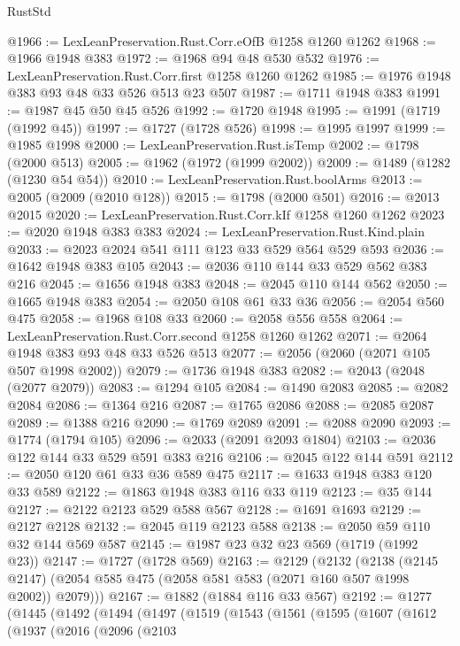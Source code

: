 \begin{lexlean}{RustStd}
\begin{coremodule}
@1966 := LexLeanPreservation.Rust.Corr.eOfB @1258 @1260 @1262
@1968 := @1966 @1948 @383
@1972 := @1968 @94 @48 @530 @532
@1976 := LexLeanPreservation.Rust.Corr.first @1258 @1260 @1262
@1985 := @1976 @1948 @383 @93 @48 @33 @526 @513 @23 @507
@1987 := @1711 @1948 @383
@1991 := @1987 @45 @50 @45 @526
@1992 := @1720 @1948
@1995 := @1991 (@1719 (@1992 @45))
@1997 := @1727 (@1728 @526)
@1998 := @1995 @1997
@1999 := @1985 @1998
@2000 := LexLeanPreservation.Rust.isTemp
@2002 := @1798 (@2000 @513)
@2005 := @1962 (@1972 (@1999 @2002))
@2009 := @1489 (@1282 (@1230 @54 @54))
@2010 := LexLeanPreservation.Rust.boolArms
@2013 := @2005 (@2009 (@2010 @128))
@2015 := @1798 (@2000 @501)
@2016 := @2013 @2015
@2020 := LexLeanPreservation.Rust.Corr.kIf @1258 @1260 @1262
@2023 := @2020 @1948 @383 @383
@2024 := LexLeanPreservation.Rust.Kind.plain
@2033 := @2023 @2024 @541 @111 @123 @33 @529 @564 @529 @593
@2036 := @1642 @1948 @383 @105
@2043 := @2036 @110 @144 @33 @529 @562 @383 @216
@2045 := @1656 @1948 @383
@2048 := @2045 @110 @144 @562
@2050 := @1665 @1948 @383
@2054 := @2050 @108 @61 @33 @36
@2056 := @2054 @560 @475
@2058 := @1968 @108 @33
@2060 := @2058 @556 @558
@2064 := LexLeanPreservation.Rust.Corr.second @1258 @1260 @1262
@2071 := @2064 @1948 @383 @93 @48 @33 @526 @513
@2077 := @2056 (@2060 (@2071 @105 @507 @1998 @2002))
@2079 := @1736 @1948 @383
@2082 := @2043 (@2048 (@2077 @2079))
@2083 := @1294 @105
@2084 := @1490 @2083
@2085 := @2082 @2084
@2086 := @1364 @216
@2087 := @1765 @2086
@2088 := @2085 @2087
@2089 := @1388 @216
@2090 := @1769 @2089
@2091 := @2088 @2090
@2093 := @1774 (@1794 @105)
@2096 := @2033 (@2091 @2093 @1804)
@2103 := @2036 @122 @144 @33 @529 @591 @383 @216
@2106 := @2045 @122 @144 @591
@2112 := @2050 @120 @61 @33 @36 @589 @475
@2117 := @1633 @1948 @383 @120 @33 @589
@2122 := @1863 @1948 @383 @116 @33 @119
@2123 := @35 @144
@2127 := @2122 @2123 @529 @588 @567
@2128 := @1691 @1693
@2129 := @2127 @2128
@2132 := @2045 @119 @2123 @588
@2138 := @2050 @59 @110 @32 @144 @569 @587
@2145 := @1987 @23 @32 @23 @569 (@1719 (@1992 @23))
@2147 := @1727 (@1728 @569)
@2163 := @2129
    (@2132
      (@2138 (@2145 @2147) (@2054 @585 @475 (@2058 @581 @583 (@2071 @160 @507 @1998 @2002)) @2079)))
@2167 := @1882 (@1884 @116 @33 @567)
@2192 := @1277
    (@1445
      (@1492
        (@1494
          (@1497
            (@1519
              (@1543
                (@1561
                  (@1595
                    (@1607
                      (@1612
                        (@1937
                          (@2016
                            (@2096
                              (@2103

\end{coremodule}
\end{lexlean}
